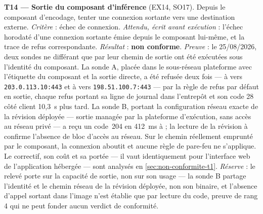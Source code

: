\textbf{T14 --- Sortie du composant d'inférence} (EX14, SO17). Depuis le composant d'encodage,
tenter une connexion sortante vers une destination externe. \emph{Critère} : échec de connexion.
\emph{Attendu, écrit avant exécution} : l'échec horodaté d'une connexion sortante émise depuis le
composant lui-même, et la trace de refus correspondante. \emph{Résultat} : \textbf{non conforme}.
\emph{Preuve} : le 25/08/2026, deux sondes ne différant que par leur chemin de sortie ont été
exécutées sous l'identité du composant. La sonde A, placée dans le sous-réseau plateforme avec
l'étiquette du composant et la sortie directe, a été refusée deux fois --- à  vers
\texttt{203.0.113.10:443} et à  vers \texttt{198.51.100.7:443} --- par la règle de
refus par défaut en sortie, chaque refus portant sa ligne de journal dans l'entrepôt et son code 28
côté client 10,3~s plus tard. La sonde B, portant la configuration réseau exacte de la révision
déployée --- sortie managée par la plateforme d'exécution, sans accès au réseau privé --- a reçu un
code~204 en 412~ms à  ; la lecture de la révision à  confirme l'absence de
bloc d'accès au réseau. Sur le chemin réellement emprunté par le composant, la connexion aboutit et
aucune règle de pare-feu ne s'applique. Le correctif, son coût et sa portée --- il vaut identiquement pour l'interface web de l'application
hébergée --- sont analysés en \cref{sec:non-conformite-t1}. \emph{Réserve} : le relevé porte sur la
capacité de sortie, non sur son usage --- la sonde B partage l'identité et le chemin réseau de la
révision déployée, non son binaire, et l'absence d'appel sortant dans l'image n'est établie que par
lecture du code, preuve de rang 4 qui ne peut fonder aucun verdict de conformité.

